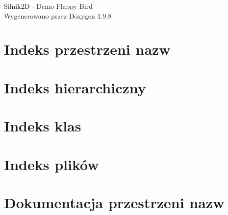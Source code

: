 \documentclass[twoside]{book}
\newcommand{\+}{\discretionary{\mbox{\scriptsize$\hookleftarrow$}}{}{}}
\newcommand{\clearemptydoublepage}{%
    \newpage{\pagestyle{empty}\cleardoublepage}%
  }
\begin{document}
  \raggedbottom
    \hypersetup{pageanchor=false,
                bookmarksnumbered=true,
                pdfencoding=unicode
               }
  \begin{titlepage}
  \vspace*{7cm}
  \begin{center}%
  {\Large Silnik2\+D -\/ Demo Flappy Bird}\\
  \vspace*{1cm}
  {\large Wygenerowano przez Doxygen 1.9.8}\\
  \end{center}
  \end{titlepage}
  \clearemptydoublepage
  \tableofcontents
  \clearemptydoublepage
  \hypersetup{pageanchor=true}
\chapter{Indeks przestrzeni nazw}

\chapter{Indeks hierarchiczny}

\chapter{Indeks klas}

\chapter{Indeks plików}

\chapter{Dokumentacja przestrzeni nazw}



\end{document}
